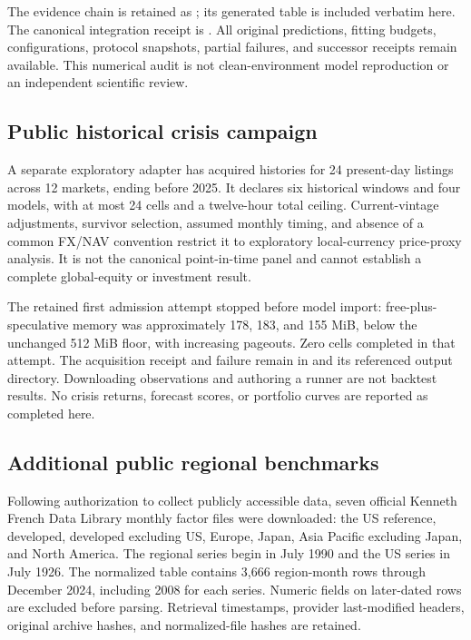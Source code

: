 \documentclass[11pt,a4paper]{article}
\begin{document}
The evidence chain is retained as ; its generated table is included verbatim here. The canonical integration receipt is . All original predictions, fitting budgets, configurations, protocol snapshots, partial failures, and successor receipts remain available. This numerical audit is not clean-environment model reproduction or an independent scientific review.

\subsection{Public historical crisis campaign}
A separate exploratory adapter has acquired histories for 24 present-day listings across 12 markets, ending before 2025. It declares six historical windows and four models, with at most 24 cells and a twelve-hour total ceiling. Current-vintage adjustments, survivor selection, assumed monthly timing, and absence of a common FX/NAV convention restrict it to exploratory local-currency price-proxy analysis. It is not the canonical point-in-time panel and cannot establish a complete global-equity or investment result.

The retained first admission attempt stopped before model import: free-plus-speculative memory was approximately 178, 183, and 155 MiB, below the unchanged 512 MiB floor, with increasing pageouts. Zero cells completed in that attempt. The acquisition receipt and failure remain in  and its referenced output directory. Downloading observations and authoring a runner are not backtest results. No crisis returns, forecast scores, or portfolio curves are reported as completed here.

\subsection{Additional public regional benchmarks}
Following authorization to collect publicly accessible data, seven official Kenneth French Data Library monthly factor files were downloaded: the US reference, developed, developed excluding US, Europe, Japan, Asia Pacific excluding Japan, and North America. The regional series begin in July 1990 and the US series in July 1926. The normalized table contains 3,666 region-month rows through December 2024, including 2008 for each series. Numeric fields on later-dated rows are excluded before parsing. Retrieval timestamps, provider last-modified headers, original archive hashes, and normalized-file hashes are retained.
\end{document}
